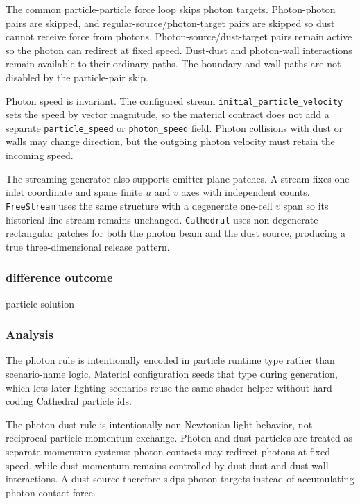 The common particle-particle force loop skips photon targets.  Photon-photon
pairs are skipped, and regular-source/photon-target pairs are skipped so dust
cannot receive force from photons.  Photon-source/dust-target pairs remain
active so the photon can redirect at fixed speed.  Dust-dust and photon-wall
interactions remain available to their ordinary paths.  The boundary and wall
paths are not disabled by the particle-pair skip.

Photon speed is invariant.  The configured stream
\texttt{initial\_particle\_velocity} sets the speed by vector magnitude, so the
material contract does not add a separate \texttt{particle\_speed} or
\texttt{photon\_speed} field.  Photon collisions with dust or walls may change
direction, but the outgoing photon velocity must retain the incoming speed.

The streaming generator also supports emitter-plane patches.  A stream fixes
one inlet coordinate and spans finite \(u\) and \(v\) axes with independent
counts.  \texttt{FreeStream} uses the same structure with a degenerate
one-cell \(v\) span so its historical line stream remains unchanged.
\texttt{Cathedral} uses non-degenerate rectangular patches for both the photon
beam and the dust source, producing a true three-dimensional release pattern.

\subsubsection{difference outcome}

particle solution

\subsubsection{Analysis}

The photon rule is intentionally encoded in particle runtime type rather than
scenario-name logic.  Material configuration seeds that type during
generation, which lets later lighting scenarios reuse the same shader helper
without hard-coding Cathedral particle ids.

The photon-dust rule is intentionally non-Newtonian light behavior, not
reciprocal particle momentum exchange.  Photon and dust particles are treated
as separate momentum systems: photon contacts may redirect photons at fixed
speed, while dust momentum remains controlled by dust-dust and dust-wall
interactions.  A dust source therefore skips photon targets instead of
accumulating photon contact force.

